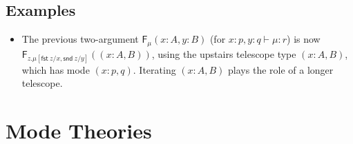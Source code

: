 \documentclass[10pt]{article}
\newtheorem{lemma}{Lemma}
\theoremstyle{definition}
\newcommand\dsd[1]{\ensuremath{\mathsf{#1}}}
\newcommand{\app}[2]{\ensuremath{#1 \: #2}}
\newcommand{\telety}[3]{\ensuremath{(#1{:}#2,#3)}}
\newcommand{\sigmacl}[3]{\ensuremath{(#1{:}#2,#3)}}
\newcommand{\fst}[1]{\app{\dsd{fst}}{#1}}
\newcommand{\snd}[1]{\app{\dsd{snd}}{#1}}
\newcommand{\id}{\mathsf{id}}
\newcommand{\rewrite}[2]{\overleftarrow{#1}(#2)}
\newcommand\F[2]{\ensuremath{\mathsf{F}_{#1}(#2)}}
\newcommand\StI[2]{\ensuremath{\mathsf{st}_{#1}(#2)}}
\newcommand\ap[2]{\ensuremath{#1 \langle #2 \rangle }}
\newcommand\ctxtuple[1]{(#1)}
\begin{document}
%
%

\subsection{Examples}

\begin{itemize}
\item 
The previous two-argument \F{\mu}{x:A,y:B} (for $x :p, y:q \vdash \mu :
r$) is now \F{z.\mu[\fst z/x,\snd z/y]}{\telety{x}{A}{B}}, using the
upstairs telescope type ${\telety{x}{A}{B}}$, which has mode
$\sigmacl{x}{p}{q}$.  Iterating $\telety{x}{A}{B}$ plays the role of a
longer telescope.  
\end{itemize}

\section{Mode Theories}
\end{document}
